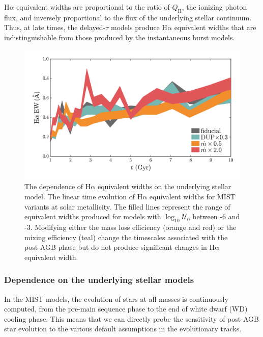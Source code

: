 \documentclass[preprint2]{aastex62}
\newcommand{\ha}{\ensuremath{\mathrm{H\alpha}}\xspace}
\newcommand{\logten}{\ensuremath{\log_{10}}}
\newcommand{\QH}{\ensuremath{Q_{\mathrm{H}}}\xspace}
\newcommand{\logU}{\ensuremath{\logten \mathcal{U}_0}}
\begin{document}
\ha equivalent widths are proportional to the ratio of \QH, the ionizing photon flux, and inversely proportional to the flux of the underlying stellar continuum. Thus, at late times, the delayed-$\tau$ models produce \ha equivalent widths that are indistinguishable from those produced by the instantaneous burst models.

\begin{figure}[ht]
  \begin{center}
    \includegraphics[width=\textwidth]{figs/f7.png}
    \caption{{\sc The dependence of \ha equivalent widths on the underlying stellar model.} The linear time evolution of \ha equivalent widths for MIST variants at solar metallicity. The filled lines represent the range of equivalent widths produced for models with \logU{} between -6 and -3. Modifying either the mass loss efficiency (orange and red) or the mixing efficiency (teal) change the timescales associated with the post-AGB phase but do not produce significant changes in \ha equivalent width.}
    \label{fig:EWvar}
  \end{center}
\end{figure}

\subsubsection{Dependence on the underlying stellar models} \label{sec:stars:emis:isochrones}

In the MIST models, the evolution of stars at all masses is continuously computed, from the pre-main sequence phase to the end of white dwarf (WD) cooling phase. This means that we can directly probe the sensitivity of post-AGB star evolution to the various default assumptions in the evolutionary tracks.
\end{document}
